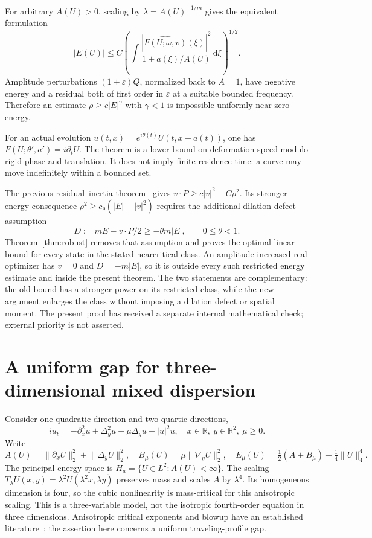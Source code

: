 \documentclass[11pt]{article}
\theoremstyle{definition}
\theoremstyle{remark}
\newcommand{\R}{\mathbb R}
\newcommand{\norm}[1]{\lVert #1\rVert}
\newcommand{\ep}{\varepsilon}
\newcommand{\dd}{\,\mathrm d}
\begin{document}
For arbitrary $A(U)>0$, scaling by $\lambda=A(U)^{-1/m}$ gives the equivalent formulation
\begin{equation}\label{eq:scaledresidual}
 |E(U)|\le C\left(\int
       \frac{|\widehat{F(U;\omega,v)}(\xi)|^2}
                    {1+a(\xi)/A(U)}\dd\xi\right)^{1/2}.
\end{equation}
Amplitude perturbations $(1+\ep)Q$, normalized back to $A=1$, have negative energy and a residual both of first order in $\ep$ at a suitable bounded frequency. Therefore an estimate $\rho\ge c|E|^\gamma$ with $\gamma<1$ is impossible uniformly near zero energy.

For an actual evolution $u(t,x)=e^{i\theta(t)}U(t,x-a(t))$, one has $F(U;\theta',a')=i\partial_tU$. The theorem is a lower bound on deformation speed modulo rigid phase and translation. It does not imply finite residence time: a curve may move indefinitely within a bounded set.

The previous residual--inertia theorem~\cite[Theorem 3.3, pp.~12--13]{ProjectR9} gives $v\cdot P\ge c|v|^2-C\rho^2$. Its stronger energy consequence $\rho^2\ge c_\theta(|E|+|v|^2)$ requires the additional dilation-defect assumption
\[
 D:=mE-v\cdot P/2\ge-\theta m|E|,\qquad 0\le\theta<1.
\]
Theorem~\ref{thm:robust} removes that assumption and proves the optimal linear bound for every state in the stated nearcritical class. An amplitude-increased real optimizer has $v=0$ and $D=-m|E|$, so it is outside every such restricted energy estimate and inside the present theorem. The two statements are complementary: the old bound has a stronger power on its restricted class, while the new argument enlarges the class without imposing a dilation defect or spatial moment. The present proof has received a separate internal mathematical check; external priority is not asserted.

\section{A uniform gap for three-dimensional mixed dispersion}\label{sec:mixed}

Consider one quadratic direction and two quartic directions,
\begin{equation}\label{eq:mixedpde}
 iu_t=-\partial_x^2u+\Delta_y^2u-\mu\Delta_yu-|u|^2u,
 \quad x\in\R,\ y\in\R^2,\ \mu\ge0.
\end{equation}
Write
\[
 A(U)=\norm{\partial_xU}_2^2+\norm{\Delta_yU}_2^2,
 \quad B_\mu(U)=\mu\norm{\nabla_yU}_2^2,
 \quad E_\mu(U)=\tfrac12(A+B_\mu)-\tfrac14\norm U_4^4.
\]
The principal energy space is $H_a=\{U\in L^2:A(U)<\infty\}$. The scaling $T_\lambda U(x,y)=\lambda^2U(\lambda^2x,\lambda y)$ preserves mass and scales $A$ by $\lambda^4$. Its homogeneous dimension is four, so the cubic nonlinearity is mass-critical for this anisotropic scaling. This is a three-variable model, not the isotropic fourth-order equation in three dimensions. Anisotropic critical exponents and blowup have an established literature~\cite{Fibich,Komada}; the assertion here concerns a uniform traveling-profile gap.
\end{document}

